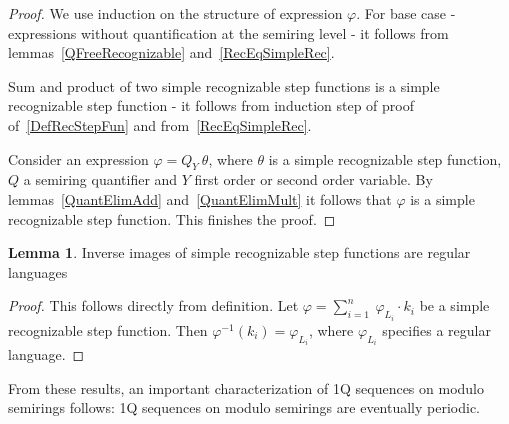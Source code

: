 \documentclass[12pt]{article}
\theoremstyle{definition}
\newtheorem{lemma}[theorem]{Lemma}
\begin{document}
\begin{proof}
    We use induction on the structure of expression $\varphi$. For base case - expressions without quantification at the semiring level - it follows from lemmas~\ref{QFreeRecognizable} and~\ref{RecEqSimpleRec}. 
    
    Sum and product of two simple recognizable step functions is a simple recognizable step function - it follows from induction step of proof of~\cref{DefRecStepFun} and from~\cref{RecEqSimpleRec}.

    Consider an expression $\varphi = Q_Y \ \theta$, where $\theta$ is a simple recognizable step function, $Q$ a semiring quantifier and $Y$ first order or second order variable. By lemmas~\ref{QuantElimAdd} and~\ref{QuantElimMult} it follows that $\varphi$ is a simple recognizable step function. This finishes the proof.
\end{proof}

\begin{lemma}
    \label{InvAreReg}
    Inverse images of simple recognizable step functions are regular languages
\end{lemma}

\begin{proof}
    This follows directly from definition. Let $\varphi = \sum_{i = 1}^{n} \ \varphi_{L_i} \cdot k_i$ be a simple recognizable step function. Then $\varphi^{-1}(k_i) = \varphi_{L_i}$, where $\varphi_{L_i}$ specifies a regular language.
\end{proof}

From these results, an important characterization of 1Q sequences on modulo semirings follows: 1Q sequences on modulo semirings are eventually periodic.




    
\end{document}
